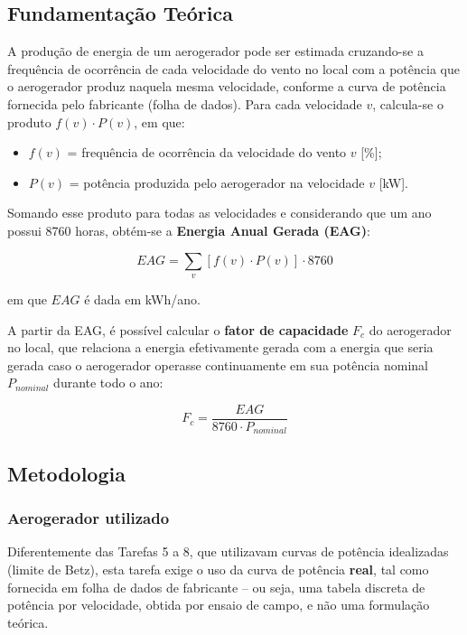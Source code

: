 \documentclass[11pt,a4paper]{article}
\begin{document}
\subsection{Fundamentação Teórica}

A produção de energia de um aerogerador pode ser estimada cruzando-se a
frequência de ocorrência de cada velocidade do vento no local com a
potência que o aerogerador produz naquela mesma velocidade, conforme a
curva de potência fornecida pelo fabricante (folha de dados). Para cada
velocidade $v$, calcula-se o produto $f(v)\cdot P(v)$, em que:

\begin{itemize}
    \item $f(v)$ = frequência de ocorrência da velocidade do vento $v$ [\%];
    \item $P(v)$ = potência produzida pelo aerogerador na velocidade $v$ [kW].
\end{itemize}

Somando esse produto para todas as velocidades e considerando que um
ano possui 8760 horas, obtém-se a \textbf{Energia Anual Gerada (EAG)}:

\begin{equation}
    EAG = \sum_v \left[f(v)\cdot P(v)\right] \cdot 8760
    \label{eq:eag}
\end{equation}

em que $EAG$ é dada em kWh/ano.

A partir da EAG, é possível calcular o \textbf{fator de capacidade}
$F_c$ do aerogerador no local, que relaciona a energia efetivamente
gerada com a energia que seria gerada caso o aerogerador operasse
continuamente em sua potência nominal $P_{nominal}$ durante todo o ano:

\begin{equation}
    F_c = \frac{EAG}{8760\cdot P_{nominal}}
    \label{eq:fc}
\end{equation}

\subsection{Metodologia}

\subsubsection{Aerogerador utilizado}

Diferentemente das Tarefas 5 a 8, que utilizavam curvas de potência
idealizadas (limite de Betz), esta tarefa exige o uso da curva de
potência \textbf{real}, tal como fornecida em folha de dados de
fabricante -- ou seja, uma tabela discreta de potência por velocidade,
obtida por ensaio de campo, e não uma formulação teórica.
\end{document}
